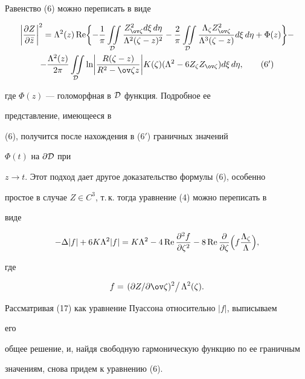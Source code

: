  


\begin{note} Равенство (6) можно переписать в виде 


\begin{multline} 


\biggl|\frac{\partial Z}{\partial\Bar z}\biggr|^2=\Lambda^2(z)\re 


\biggl\{-\frac{1}{\pi}\iintl_{\cal D} 


\frac{Z^2_{\ov\zeta}d\xi\,d\eta}{\Lambda^2(\zeta-z)^2} 


-\frac{2}{\pi}\iintl_{\cal D} 


\frac{\Lambda_\zeta Z^2_{\ov\zeta}}{\Lambda^3(\zeta-z)}d\xi\,d\eta+ 


\Phi(z)\biggr\} -\\ 


% 


-\frac{\Lambda^2(z)}{2\pi}\iintl_{\cal D}\ln\biggl| 


\frac{R(\zeta-z)}{R^2-\ov\zeta z}\biggr|K(\zeta) 


(\Lambda^2-6Z_\zeta Z_{\ov\zeta})d\xi\,d\eta,\tag{6${}'$} 


\end{multline} 


\addtocounter{equation}{-1}


где $\Phi(z)$ --- голоморфная в $\cal D$ функция. Подробное ее 


представление, имеющееся в 


(6), получится после нахождения в (6${}'$) граничных значений 


$\Phi(t)$ на $\partial\cal D$ при 


$z\to t$. Этот подход дает другое доказательство формулы (6), особенно 


простое в случае $Z\in C^3$, т.\,к. тогда уравнение (4) можно переписать в 


виде 


\begin{equation} 


-\Delta|f|+6K\Lambda^2|f|=K\Lambda^2-4\re 


\frac{\partial^2f}{\partial\zeta^2}-8\re 


\frac{\partial}{\partial\zeta}\Bigl(f\frac{\Lambda_\zeta}{\Lambda}\Bigr), 


\end{equation} 


где 


$$ 


f=\left.(\partial Z/\partial\ov\zeta)^2\right/\Lambda^2(\zeta). 


$$ 


Рассматривая (17) как уравнение Пуассона относительно $|f|$, выписываем 


его 


общее решение, и, найдя свободную гармоническую функцию по ее граничным 


значениям, снова придем к уравнению (6). 


\end{note} 


